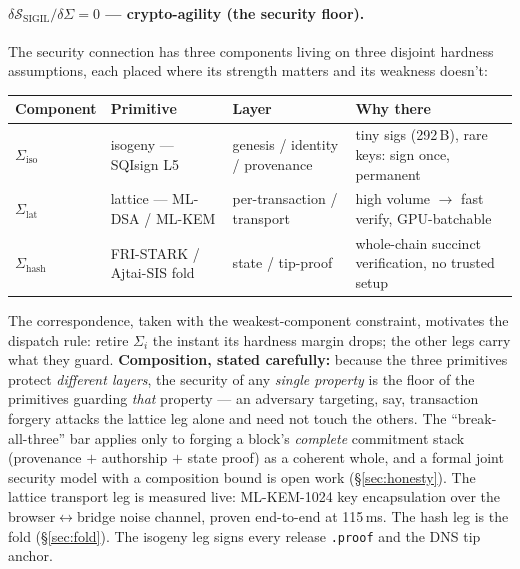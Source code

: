 \documentclass[10pt,a4paper]{article}
\newcommand{\SSIGIL}{\mathcal{S}_{\mathrm{SIGIL}}}
\begin{document}
\paragraph{$\delta\SSIGIL/\delta\Sigma = 0$ — crypto-agility (the security floor).}
\label{sec:crypto}
The security connection has three components living on three disjoint hardness
assumptions, each placed where its strength matters and its weakness doesn't:

\begin{center}
\footnotesize
\renewcommand{\arraystretch}{1.35}
\begin{tabularx}{\textwidth}{@{}l>{\RaggedRight\arraybackslash}p{3.3cm}>{\RaggedRight\arraybackslash}p{3.3cm}>{\RaggedRight\arraybackslash}X@{}}
\toprule
Component & Primitive & Layer & Why there \\
\midrule
$\Sigma_{\mathrm{iso}}$ & isogeny — SQIsign L5 & genesis / identity / provenance &
tiny sigs (292\,B), rare keys: sign once, permanent \\
$\Sigma_{\mathrm{lat}}$ & lattice — ML-DSA / ML-KEM & per-transaction / transport &
high volume $\to$ fast verify, GPU-batchable \\
$\Sigma_{\mathrm{hash}}$ & FRI-STARK / Ajtai-SIS fold & state / tip-proof &
whole-chain succinct verification, no trusted setup \\
\bottomrule
\end{tabularx}
\end{center}

The correspondence, taken with the weakest-component constraint, motivates the dispatch
rule: retire $\Sigma_i$ the instant its hardness margin drops; the other legs carry what
they guard. \textbf{Composition, stated carefully:} because the three primitives protect
\emph{different layers}, the security of any \emph{single property} is the floor of the
primitives guarding \emph{that} property — an adversary targeting, say, transaction
forgery attacks the lattice leg alone and need not touch the others. The
``break-all-three'' bar applies only to forging a block's \emph{complete} commitment
stack (provenance $+$ authorship $+$ state proof) as a coherent whole, and a formal
joint security model with a composition bound is open work (\S\ref{sec:honesty}). The
lattice transport leg is measured live: ML-KEM-1024 key encapsulation over the
browser$\leftrightarrow$bridge noise channel, proven end-to-end at 115\,ms. The hash leg
is the fold (\S\ref{sec:fold}). The isogeny leg signs every release \texttt{.proof} and
the DNS tip anchor.
\end{document}
